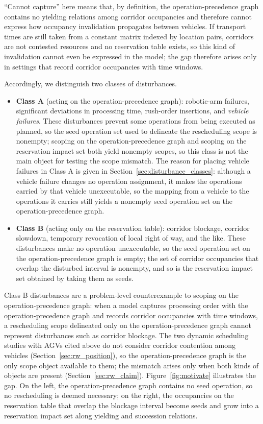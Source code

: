 \documentclass[manuscript,screen,review]{acmart}
\begin{document}
``Cannot capture'' here means that, by definition, the operation-precedence graph contains no yielding relations among corridor occupancies and therefore cannot express how occupancy invalidation propagates between vehicles.
If transport times are still taken from a constant matrix indexed by location pairs, corridors are not contested resources and no reservation table exists, so this kind of invalidation cannot even be expressed in the model;
the gap therefore arises only in settings that record corridor occupancies with time windows.

Accordingly, we distinguish two classes of disturbances.
\begin{itemize}[leftmargin=1.5em,itemsep=0.25em]
\item \textbf{Class A} (acting on the operation-precedence graph): robotic-arm failures, significant deviations in processing time, rush-order insertions, and \emph{vehicle failures}.
These disturbances prevent some operations from being executed as planned, so the seed operation set used to delineate the rescheduling scope is nonempty;
scoping on the operation-precedence graph and scoping on the reservation impact set both yield nonempty scopes, so this class is not the main object for testing the scope mismatch.
The reason for placing vehicle failures in Class A is given in Section~\ref{sec:disturbance_classes}: although a vehicle failure changes no operation assignment,
it makes the operations carried by that vehicle unexecutable, so the mapping from a vehicle to the operations it carries still yields a nonempty seed operation set on the operation-precedence graph.
\item \textbf{Class B} (acting only on the reservation table): corridor blockage, corridor slowdown, temporary revocation of local right of way, and the like.
These disturbances make no operation unexecutable, so the seed operation set on the operation-precedence graph is empty;
the set of corridor occupancies that overlap the disturbed interval is nonempty, and so is the reservation impact set obtained by taking them as seeds.
\end{itemize}
Class B disturbances are a problem-level counterexample to scoping on the operation-precedence graph: when a model captures processing order with the operation-precedence graph
and records corridor occupancies with time windows, a rescheduling scope delineated only on the operation-precedence graph cannot represent disturbances such as corridor blockage.
The two dynamic scheduling studies with AGVs cited above do not consider corridor contention among vehicles (Section~\ref{sec:rw_position}),
so the operation-precedence graph is the only scope object available to them; the mismatch arises only when both kinds of objects are present (Section~\ref{sec:rw_claim}).
Figure~\ref{fig:motivate} illustrates the gap. On the left, the operation-precedence graph contains no seed operation, so no rescheduling is deemed necessary;
on the right, the occupancies on the reservation table that overlap the blockage interval become seeds and grow into a reservation impact set along yielding and succession relations.
\end{document}
